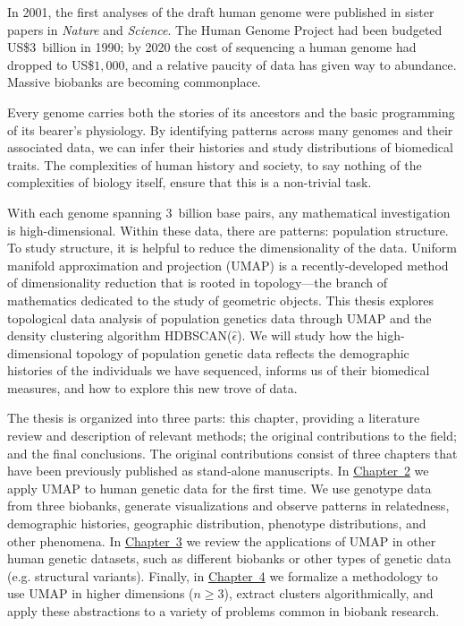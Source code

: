 In 2001, the first analyses of the draft human genome were published in sister papers in \textit{Nature} and \textit{Science}. The Human Genome Project had been budgeted US\$$3$~billion in 1990; by 2020 the cost of sequencing a human genome had dropped to US\$$1,000$, and a relative paucity of data has given way to abundance\citep{gibbs_human_2020}. Massive biobanks are becoming commonplace.

Every genome carries both the stories of its ancestors and the basic programming of its bearer's physiology. By identifying patterns across many genomes and their associated data, we can infer their histories and study distributions of biomedical traits. The complexities of human history and society, to say nothing of the complexities of biology itself, ensure that this is a non-trivial task.

With each genome spanning $3$~billion base pairs, any mathematical investigation is high-dimensional. Within these data, there are patterns: population structure. To study structure, it is helpful to reduce the dimensionality of the data. Uniform manifold approximation and projection (UMAP) is a recently-developed method of dimensionality reduction that is rooted in topology---the branch of mathematics dedicated to the study of geometric objects. This thesis explores topological data analysis of population genetics data through UMAP and the density clustering algorithm HDBSCAN($\hat{\epsilon}$). We will study how the high-dimensional topology of population genetic data reflects the demographic histories of the individuals we have sequenced, informs us of their biomedical measures, and how to explore this new trove of data.

The thesis is organized into three parts: this chapter, providing a literature review and description of relevant methods; the original contributions to the field; and the final conclusions. The original contributions consist of three chapters that have been previously published as stand-alone manuscripts. In \hyperref[chap:chapter2]{Chapter~2} we apply UMAP to human genetic data for the first time. We use genotype data from three biobanks, generate visualizations and observe patterns in relatedness, demographic histories, geographic distribution, phenotype distributions, and other phenomena. In \hyperref[chap:chapter3]{Chapter~3} we review the applications of UMAP in other human genetic datasets, such as different biobanks or other types of genetic data (e.g. structural variants). Finally, in \hyperref[chap:chapter4]{Chapter~4} we formalize a methodology to use UMAP in higher dimensions ($n \ge 3$), extract clusters algorithmically, and apply these abstractions to a variety of problems common in biobank research.


